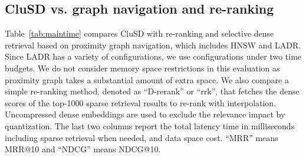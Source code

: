  







\subsection{CluSD vs. graph navigation and re-ranking} 
\label{sect:evaltimebudget}
Table~\ref{tab:maintime} compares  CluSD with  re-ranking and selective dense retrieval based on proximity graph navigation, which includes HNSW and LADR.
Since LADR has a variety of configurations, we use configurations under two time budgets.
We do not consider memory space restrictions in this evaluation as proximity graph takes a substantial amount of extra space.
We also compare  a simple re-ranking method,  denoted as ``D-rerank'' or ``rrk'',
that fetches the dense scores of the top-1000 sparse retrieval results to re-rank with interpolation.
Uncompressed dense embeddings  are used to exclude the relevance impact by quantization.
The last two columns report the total latency time in milliseconds including sparse retrieval when needed,
and data space cost. %
``MRR'' means  MRR@10 and ``NDCG'' means  NDCG@10.

